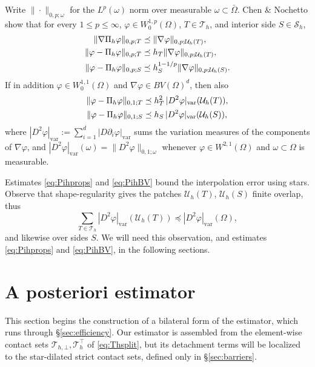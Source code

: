 \documentclass[12pt]{amsart}
\numberwithin{equation}{section}
\theoremstyle{plain}
\theoremstyle{definition}
\theoremstyle{remark}
\newcommand{\Om}{\Omega}
\newcommand{\Th}{\mathcal{T}_h}
\newcommand{\Sh}{\mathcal{S}_h}
\newcommand{\Pih}{\Pi_h}
\newcommand{\Uh}{\mathcal{U}_h}
\newcommand{\Thbot}{\mathcal{T}_{h,\bot}}
\newcommand{\Thtop}{\Th^\top}
\begin{document}
Write $\|\cdot\|_{0,p;\omega}$ for the $L^p(\omega)$ norm over measurable $\omega \subset \bar\Om$.  Chen \& Nochetto \cite{ChenNochetto2000} show that for every $1\le p\le\infty$, $\varphi \in W_0^{1,p}(\Om)$, $T\in\Th$, and interior side $S\in\Sh$,
\begin{align}
\label{eq:Pihprops}
  \|\nabla\Pih\varphi\|_{0,p;T} &\preceq \|\nabla\varphi\|_{0,p;\Uh(T)}, \\
  \|\varphi - \Pih\varphi\|_{0,p;T} &\preceq h_T\|\nabla\varphi\|_{0,p;\Uh(T)}, \notag \\
  \|\varphi - \Pih\varphi\|_{0,p;S} &\preceq h_S^{1-1/p}\|\nabla\varphi\|_{0,p;\Uh(S)}. \notag
\end{align}
If in addition $\varphi \in W_0^{1,1}(\Om)$ and $\nabla\varphi \in BV(\Om)^d$, then also
\begin{align}
\label{eq:PihBV}
  \|\varphi-\Pih\varphi\|_{0,1;T} &\preceq h_T^2\, |D^2\varphi|_{\mathrm{var}}(\Uh(T)), \\
  \|\varphi-\Pih\varphi\|_{0,1;S} &\preceq h_S\, |D^2\varphi|_{\mathrm{var}}(\Uh(S)), \notag
\end{align}
where $|D^2\varphi|_{\mathrm{var}} := \sum_{i=1}^d |D\partial_i\varphi|_{\mathrm{var}}$ sums the variation measures \cite{EvansGariepy2015} of the components of $\nabla\varphi$, and $|D^2\varphi|_{\mathrm{var}}(\omega) = \|D^2\varphi\|_{0,1;\omega}$ whenever $\varphi \in W^{2,1}(\Om)$ and $\omega \subset \Om$ is measurable.

Estimates \eqref{eq:Pihprops} and \eqref{eq:PihBV} bound the interpolation error using stars.  Observe that shape-regularity gives the patches $\Uh(T)$, $\Uh(S)$ finite overlap, thus
\begin{equation}
\label{eq:starobservation}
  \sum_{T\in\Th} |D^2\varphi|_{\mathrm{var}}(\Uh(T)) \preceq |D^2\varphi|_{\mathrm{var}}(\Om),
\end{equation}
and likewise over sides $S$.  We will need this observation, and estimates \eqref{eq:Pihprops} and \eqref{eq:PihBV}, in the following sections.


\section{A posteriori estimator} \label{sec:estimator}

This section begins the construction of a bilateral form of the \cite{NSV03} estimator, which runs through \S \ref{sec:efficiency}.  Our estimator is assembled from the element-wise contact sets $\Thbot,\Thtop$ of \eqref{eq:Thsplit}, but its detachment terms will be localized to the star-dilated strict contact sets, defined only in \S \ref{sec:barriers}.
\end{document}
